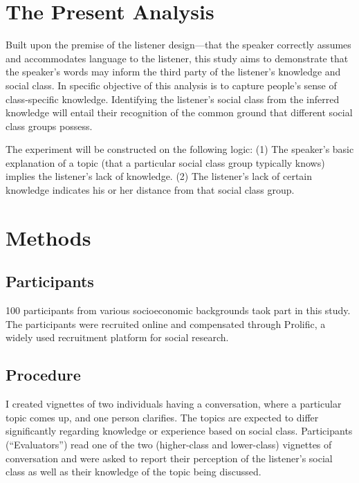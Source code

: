 \documentclass[
  man,floatsintext]{apa6}
\begin{document}
\hypertarget{the-present-analysis}{%
\section{The Present Analysis}\label{the-present-analysis}}

Built upon the premise of the listener design---that the speaker correctly assumes and accommodates language to the listener, this study aims to demonstrate that the speaker's words may inform the third party of the listener's knowledge and social class. In specific objective of this analysis is to capture people's sense of class-specific knowledge. Identifying the listener's social class from the inferred knowledge will entail their recognition of the common ground that different social class groups possess.

The experiment will be constructed on the following logic: (1) The speaker's basic explanation of a topic (that a particular social class group typically knows) implies the listener's lack of knowledge. (2) The listener's lack of certain knowledge indicates his or her distance from that social class group.

\hypertarget{methods}{%
\section{Methods}\label{methods}}

\hypertarget{participants}{%
\subsection{Participants}\label{participants}}

100 participants from various socioeconomic backgrounds taok part in this study. The participants were recruited online and compensated through Prolific, a widely used recruitment platform for social research.

\hypertarget{procedure}{%
\subsection{Procedure}\label{procedure}}

I created vignettes of two individuals having a conversation, where a particular topic comes up, and one person clarifies. The topics are expected to differ significantly regarding knowledge or experience based on social class. Participants (``Evaluators'') read one of the two (higher-class and lower-class) vignettes of conversation and were asked to report their perception of the listener's social class as well as their knowledge of the topic being discussed.
\end{document}
